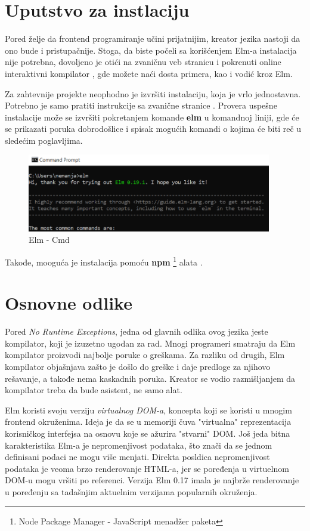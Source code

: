 \documentclass[12pt,oneside]{memoir}
\begin{document}
\section{Uputstvo za instlaciju}
Pored želje da frontend programiranje učini prijatnijim, kreator jezika nastoji da ono bude i pristupačnije. 
Stoga, da biste počeli sa korišćenjem Elm-a instalacija nije potrebna, dovoljeno je otići na zvaničnu veb 
stranicu i pokrenuti online interaktivni kompilator \cite{tryelm}, gde možete naći dosta primera, kao i vodić kroz Elm.

Za zahtevnije projekte neophodno je izvršiti instalaciju, koja je vrlo
jednostavna. Potrebno je samo pratiti instrukcije sa zvanične stranice
\cite{installelm}. Provera uspešne instalacije može se izvršiti pokretanjem
komande \textbf{elm}  u komandnoj liniji, gde će se prikazati poruka
dobrodošlice i spisak mogućih komandi o kojima će biti reč u sledećim poglavljima. 
\begin{figure}[!ht]
  \centering
  \includegraphics[width=0.95\textwidth]{elm-cmd.png}
  \caption{Elm - Cmd}
\end{figure}

Takođe, mooguća je instalacija pomoću \textbf{npm}
\footnote{Node Package Manager - JavaScript menadžer paketa} alata \cite{npm}.

\section{Osnovne odlike}
Pored \emph{No Runtime Exceptions}, jedna od glavnih odlika ovog jezika jeste
kompilator, koji je izuzetno ugodan za rad. Mnogi programeri smatraju da Elm
kompilator proizvodi najbolje poruke o greškama. Za razliku od drugih, Elm
kompilator objašnjava zašto je došlo do greške i daje predloge za njihovo rešavanje,
a takođe nema kaskadnih poruka. Kreator se vodio razmišljanjem da kompilator treba
da bude asistent, ne samo alat.

Elm koristi svoju verziju \emph{virtualnog DOM-a}, koncepta koji se koristi u mnogim
frontend okruženima. Ideja je da se u memoriji čuva "virtualna" reprezentacija
korisničkog interfejsa  na osnovu koje se ažurira "stvarni" DOM. Još jeda bitna
karakteristika Elm-a je nepromenjivost podataka, što znači da se jednom definisani
podaci ne mogu više menjati. Direkta posldica nepromenjivost podataka je veoma
brzo renderovanje HTML-a, jer se poređenja u virtuelnom DOM-u mogu vršiti po referenci. 
Verzija Elm 0.17 imala je najbrže renderovanje u poređenju sa tadašnjim aktuelnim verzijama 
popularnih okruženja.
\end{document}
